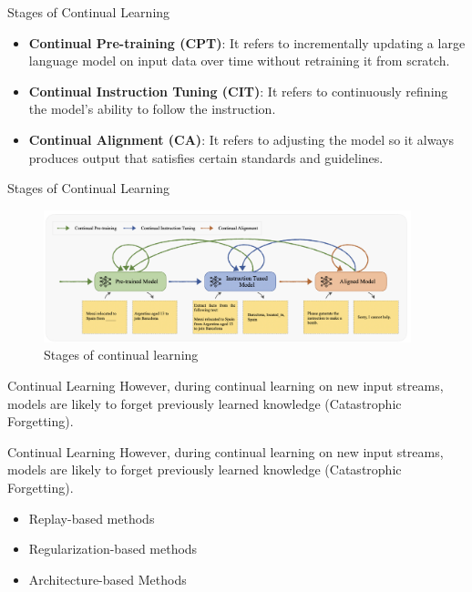 \documentclass[t]{beamer}
\begin{document}
\begin{frame}{Stages of Continual Learning\cite{Wu24}}
  \vspace{1cm}
  \begin{itemize}
    \item \textbf{Continual Pre-training (CPT)}: It refers to incrementally updating a large language model on input data over time without retraining it from scratch. 
    \newline
    \item \textbf{Continual Instruction Tuning (CIT)}: It refers to continuously refining the model's ability to follow the instruction. 
    \newline
    \item \textbf{Continual Alignment (CA)}: It refers to adjusting the model so it always produces output that satisfies certain standards and guidelines. 
  \end{itemize}
\end{frame}

\begin{frame}{Stages of Continual Learning}
  \vspace{1cm}
  \begin{figure}[htbp]
    \centering
    \includegraphics[width=0.95\textwidth]{CL stages.png}
    \caption{Stages of continual learning \cite{Wu24}}
    \label{fig:acl_stages}
  \end{figure}
\end{frame}

\begin{frame}{Continual Learning}
  \vspace{1cm}
  However, during continual learning on new input streams, models are likely to forget
  previously learned knowledge (Catastrophic Forgetting). \cite{Gupta23}
\end{frame}

\begin{frame}{Continual Learning}
  \vspace{1cm}
  However, during continual learning on new input streams, models are likely to forget
  previously learned knowledge (Catastrophic Forgetting). \cite{Gupta23}
  \vspace{1cm}
  \begin{itemize}
    \item Replay-based methods
    \item Regularization-based methods
    \item Architecture-based Methods
  \end{itemize}
\end{frame}
\end{document}
